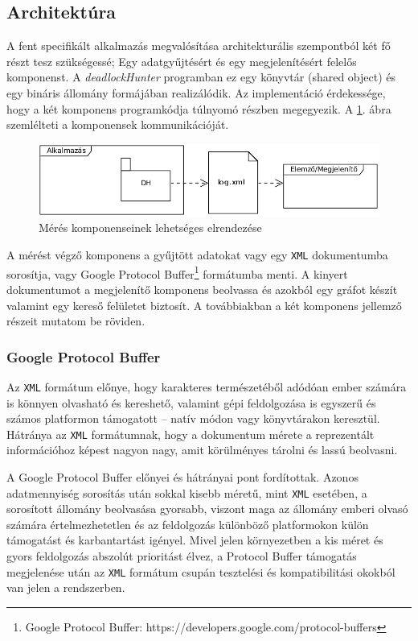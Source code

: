     \subsection{Architektúra}
    A fent specifikált alkalmazás megvalósítása architekturális szempontból két fő részt tesz szükségessé; Egy adatgyűjtésért és egy megjelenítésért felelős komponenst. A \emph{deadlockHunter} programban ez egy könyvtár (shared object) és egy bináris állomány formájában realizálódik. Az implementáció érdekessége, hogy a két komponens programkódja túlnyomó részben megegyezik. A \ref{fig:architecture}. ábra szemlélteti a komponensek kommunikációját.
    
\begin{figure}[ht!]
  \centering
    \includegraphics[width=5.4in]{figures/arch}
  \caption{Mérés komponenseinek lehetséges elrendezése}
  \label{fig:architecture}
\end{figure}    
%    
    A mérést végző komponens a gyűjtött adatokat vagy egy \texttt{XML} dokumentumba sorosítja, vagy Google Protocol Buffer\footnote{Google Protocol Buffer: https://developers.google.com/protocol-buffers} formátumba menti. A kinyert dokumentumot a megjelenítő komponens beolvassa és azokból egy gráfot készít valamint egy kereső felületet biztosít. A továbbiakban a két komponens jellemző részeit mutatom be röviden.
    
    \subsubsection{Google Protocol Buffer}
    Az \texttt{XML} formátum előnye, hogy karakteres természetéből adódóan ember számára is könnyen olvasható és kereshető, valamint gépi feldolgozása is egyszerű és számos platformon támogatott -- natív módon vagy könyvtárakon keresztül. Hátránya az \texttt{XML} formátumnak, hogy a dokumentum mérete a reprezentált információhoz képest nagyon nagy, amit körülményes tárolni és lassú beolvasni.
    
    A Google Protocol Buffer előnyei és hátrányai pont fordítottak. Azonos adatmennyiség sorosítás után sokkal kisebb méretű, mint \texttt{XML} esetében, a sorosított állomány beolvasása gyorsabb, viszont maga az állomány emberi olvasó számára értelmezhetetlen és az feldolgozás különböző platformokon külön támogatást és karbantartást igényel. Mivel jelen környezetben a kis méret és gyors feldolgozás abszolút prioritást élvez, a Protocol Buffer támogatás megjelenése után az \texttt{XML} formátum csupán tesztelési és kompatibilitási okokból van jelen a rendszerben.
    

